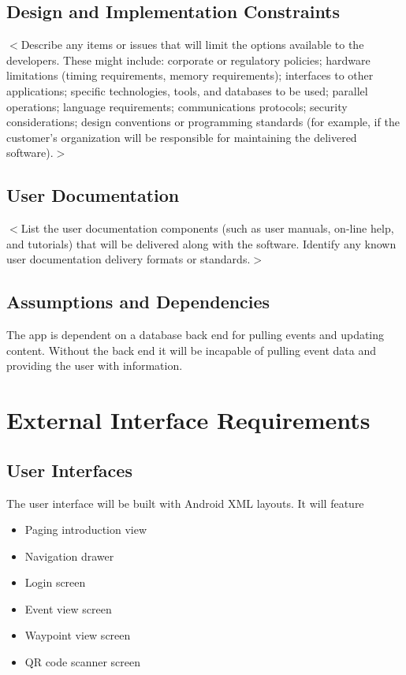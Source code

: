 \documentclass{scrreprt}
\begin{document}
\section{Design and Implementation Constraints}

$<$Describe any items or issues that will limit the options available to the 
developers. These might include: corporate or regulatory policies; hardware 
limitations (timing requirements, memory requirements); interfaces to other 
applications; specific technologies, tools, and databases to be used; parallel 
operations; language requirements; communications protocols; security 
considerations; design conventions or programming standards (for example, if the 
customer’s organization will be responsible for maintaining the delivered 
software).$>$

\section{User Documentation}
$<$List the user documentation components (such as user manuals, on-line help, 
and tutorials) that will be delivered along with the software. Identify any 
known user documentation delivery formats or standards.$>$

\section{Assumptions and Dependencies}
The app is dependent on a database back end for pulling events and updating 
content. Without the back end it will be incapable of pulling event data and 
providing the user with information.


\chapter{External Interface Requirements}

\section{User Interfaces}

The user interface will be built with Android XML layouts. It will feature
\begin{itemize}
\item Paging introduction view
\item Navigation drawer
\item Login screen
\item Event view screen
\item Waypoint view screen
\item QR code scanner screen
\end{itemize}
\end{document}
